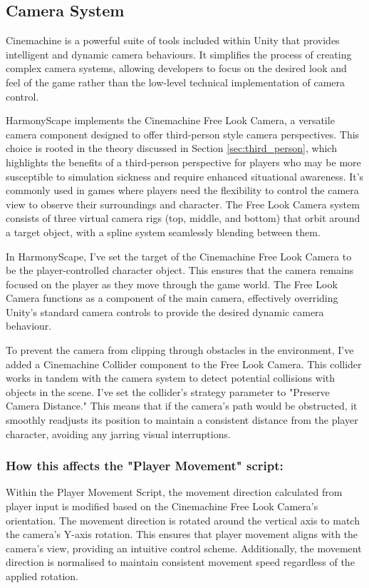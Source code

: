 \documentclass{l4proj}
\begin{document}
\subsection{Camera System}
Cinemachine is a powerful suite of tools included within Unity that provides intelligent and dynamic camera behaviours. It simplifies the process of creating complex camera systems, allowing developers to focus on the desired look and feel of the game rather than the low-level technical implementation of camera control.

HarmonyScape implements the Cinemachine Free Look Camera, a versatile camera component designed to offer third-person style camera perspectives. This choice is rooted in the theory discussed in Section \ref{sec:third_person}, which highlights the benefits of a third-person perspective for players who may be more susceptible to simulation sickness and require enhanced situational awareness. It's commonly used in games where players need the flexibility to control the camera view to observe their surroundings and character. The Free Look Camera system consists of three virtual camera rigs (top, middle, and bottom) that orbit around a target object, with a spline system seamlessly blending between them.

In HarmonyScape, I've set the target of the Cinemachine Free Look Camera to be the player-controlled character object. This ensures that the camera remains focused on the player as they move through the game world. The Free Look Camera functions as a component of the main camera, effectively overriding Unity's standard camera controls to provide the desired dynamic camera behaviour.

To prevent the camera from clipping through obstacles in the environment, I've added a Cinemachine Collider component to the Free Look Camera. This collider works in tandem with the camera system to detect potential collisions with objects in the scene. I've set the collider's strategy parameter to "Preserve Camera Distance." This means that if the camera's path would be obstructed, it smoothly readjusts its position to maintain a consistent distance from the player character, avoiding any jarring visual interruptions.

\subsubsection{How this affects the "Player Movement" script:} Within the Player Movement Script, the movement direction calculated from player input is modified based on the Cinemachine Free Look Camera's orientation. The movement direction is rotated around the vertical axis to match the camera's Y-axis rotation. This ensures that player movement aligns with the camera's view, providing an intuitive control scheme. Additionally, the movement direction is normalised to maintain consistent movement speed regardless of the applied rotation.
\end{document}
